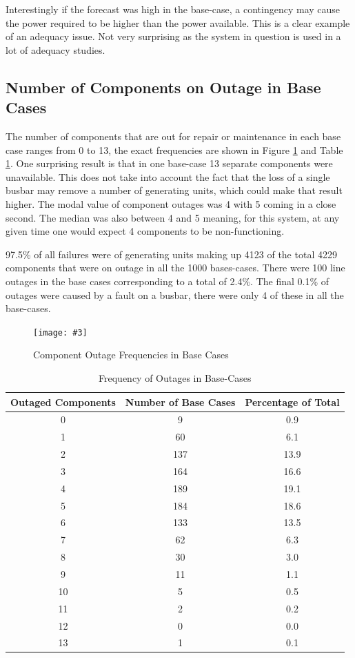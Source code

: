 \documentclass[a4paper,oneside,12pt]{report}
\newcommand{\image}[3] {
  \begin{figure}
    \begin{center}
      \texttt{[image: \#3]}
      \caption{#2}
      \label{#1}
    \end{center}
  \end{figure}
}
\begin{document}
Interestingly if the forecast was high in the base-case, a contingency may cause the power required to be higher than the power available. This is a clear example of an adequacy issue. Not very surprising as the system in question is used in a lot of adequacy studies.

\subsection{Number of Components on Outage in Base Cases}

The number of components that are out for repair or maintenance in each base case ranges from 0 to 13, the exact frequencies are shown in Figure \ref{outagefrequencies1000} and Table \ref{table_outage_frequency}. One surprising result is that in one base-case 13 separate components were unavailable. This does not take into account the fact that the loss of a single busbar may remove a number of generating units, which could make that result higher. The modal value of component outages was 4 with 5 coming in a close second. The median was also between 4 and 5 meaning, for this system, at any given time one would expect 4 components to be non-functioning.

97.5\% of all failures were of generating units making up 4123 of the total 4229 components that were on outage in all the 1000 bases-cases. There were 100 line outages in the base cases corresponding to a total of 2.4\%. The final 0.1\% of outages were caused by a fault on a busbar, there were only 4 of these in all the base-cases.

\image{outagefrequencies1000}{Component Outage Frequencies in Base Cases}{outagefrequencies1000.png}

\begin{table}[htbp]
\caption{Frequency of Outages in Base-Cases}
\label{table_outage_frequency}
\centering
\begin{tabular}{c||c||c}
\bfseries Outaged Components & \bfseries Number of Base Cases & \bfseries Percentage of Total  \\ 
\hline \hline
0 & 9 & 0.9  \\ 
1 & 60 & 6.1  \\ 
2 & 137 & 13.9  \\ 
3 & 164 & 16.6  \\ 
4 & 189 & 19.1  \\ 
5 & 184 & 18.6  \\ 
6 & 133 & 13.5  \\ 
7 & 62 & 6.3  \\ 
8 & 30 & 3.0  \\ 
9 & 11 & 1.1  \\ 
10 & 5 & 0.5  \\ 
11 & 2 & 0.2  \\ 
12 & 0 & 0.0  \\ 
13 & 1 & 0.1  \\ 
\hline
\end{tabular}\\
\end{table}
\end{document}
